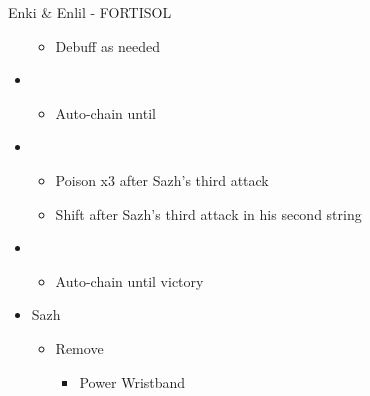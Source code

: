 \begin{battle}[1:23]{Enki \& Enlil - FORTISOL}
\begin{itemize}
\begin{itemize}
				      \item Debuff as needed
			      \end{itemize}
                                \item \fourth
			      \begin{itemize}
				      \item Auto-chain until \stagger
			      \end{itemize}
			\item \sixth
			      \begin{itemize}
				      \item Poison x3 after Sazh's third attack
				      \item Shift after Sazh's third attack in his second string
			      \end{itemize}
			\item \first
			      \begin{itemize}
				      \item Auto-chain until victory
			      \end{itemize}
		\end{itemize}
		\end{battle}
\begin{menu}
	\begin{itemize}
		\equip
		\begin{itemize}
			\item Sazh
			      \begin{itemize}
				      \item Remove
				            \begin{itemize}
					            \item Power Wristband
				            \end{itemize}
			      \end{itemize}
		\end{itemize}
	\end{itemize}
\end{menu}
